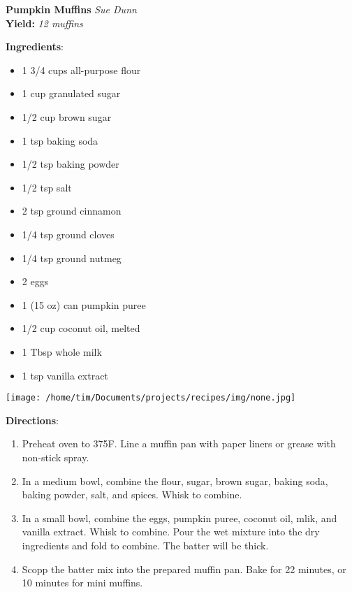 \documentclass[11pt, twoside, openany]{book}
\begin{document}
\noindent\begin{minipage}[t]{\linewidth}%
{\Large\textbf{Pumpkin Muffins}} \label{pumpkin-muffins}\hfill\textit{Sue Dunn}\\
\textbf{Yield:} \textit{12 muffins}\\
\noindent\begin{minipage}[t]{0.78\linewidth}%
\textbf{Ingredients}:\vspace{-3mm}
\begin{multicols}{2}
\begin{itemize}\setlength\itemsep{-1mm}
\item 1 3/4 cups all-purpose flour
\item 1 cup granulated sugar
\item 1/2 cup brown sugar
\item 1 tsp baking soda
\item 1/2 tsp baking powder
\item 1/2 tsp salt
\item 2 tsp ground cinnamon
\item 1/4 tsp ground cloves
\item 1/4 tsp ground nutmeg
\item 2 eggs
\item 1 (15 oz) can pumpkin puree
\item 1/2 cup coconut oil, melted
\item 1 Tbsp whole milk
\item 1 tsp vanilla extract
\end{itemize}
\end{multicols}
\end{minipage}
\noindent\begin{minipage}[t]{0.18\linewidth}
\centering \strut\vspace*{-\baselineskip}\newline
\texttt{[image: /home/tim/Documents/projects/recipes/img/none.jpg]}\\
\end{minipage}\vspace{3mm}
\textbf{Directions}:
\vspace{-3mm}\begin{enumerate}\setlength\itemsep{-1mm}
\item Preheat oven to 375F. Line a muffin pan with paper liners or grease with non-stick spray.
\item In a medium bowl, combine the flour, sugar, brown sugar, baking soda, baking powder, salt, and spices. Whisk to combine.
\item In a small bowl, combine the eggs, pumpkin puree, coconut oil, mlik, and vanilla extract. Whisk to combine. Pour the wet mixture into the dry ingredients and fold to combine. The batter will be thick.
\item Scopp the batter mix into the prepared muffin pan. Bake for 22 minutes, or 10 minutes for mini muffins.
\end{enumerate}
\end{minipage}\vspace{8mm}
\end{document}
